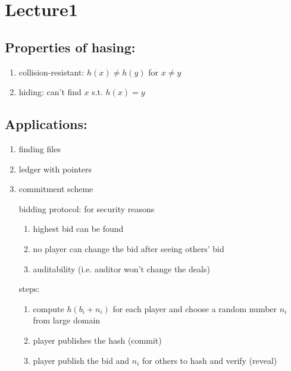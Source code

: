 \documentclass[../main.tex]{subfiles}
\begin{document}
\section{Lecture1}
\subsection{Properties of hasing:}
\begin{enumerate}
	\item collision-resistant: $h(x) \neq h(y)$ for $x \neq y$

	\item hiding: can't find $x$ s.t.  $h(x) = y$
\end{enumerate}

\subsection{Applications:}
\begin{enumerate}
	\item	finding files
	\item ledger with pointers
	\item commitment scheme

			bidding protocol: for security reasons
			\begin{enumerate}
				\item highest bid can be found
				\item no player can change the bid after seeing others' bid
				\item auditability (i.e. auditor won't change the deals)
			\end{enumerate}

			steps:
			\begin{enumerate}
				\item		compute $h(b_i + n_i)$ for each player and choose a random number  $n_i$ from large domain
				\item player publishes the hash (commit)
				\item player publish the bid and  $n_i$ for others to hash and verify (reveal)
			\end{enumerate}
\end{enumerate}
\end{document}

